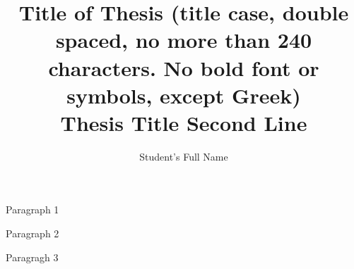 \documentclass[12pt]{ucalgthes1}
\title{Title of Thesis (title case, double spaced, no more than 240 characters. No bold font or symbols, except Greek) \\ \bigskip
Thesis Title Second Line }
\author{Student's Full Name}
\newcommand{\thesistitle}{Title of Thesis}
\begin{document}
\makethesistitle
{}     %
\setcounter{page}{2}

%
%

%
\newpage
{}
{}
Paragraph 1

Paragraph 2

Paragragh 3
\end{document}
